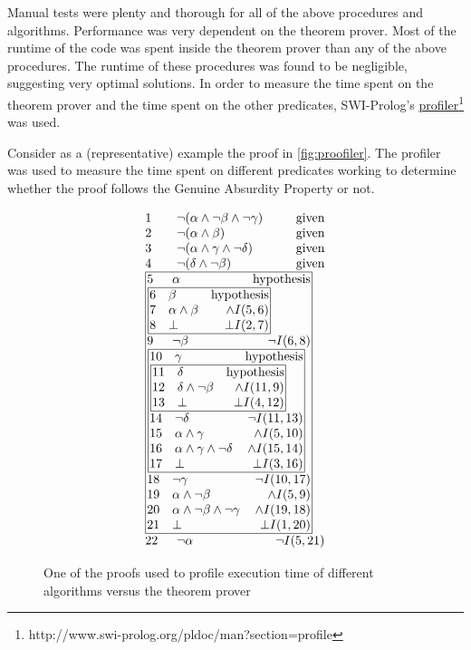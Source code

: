 \documentclass[11pt,twoside,a4paper]{report}
\begin{document}
Manual tests were plenty and thorough for all of the above procedures and algorithms. Performance was very dependent on the theorem prover. Most of the runtime of the code was spent inside the theorem prover than any of the above procedures. The runtime of these procedures was found to be negligible, suggesting very optimal solutions. In order to measure the time spent on the theorem prover and the time spent on the other predicates, SWI-Prolog's \href{http://www.swi-prolog.org/pldoc/man?section=profile}{profiler}\footnote{http://www.swi-prolog.org/pldoc/man?section=profile} was used. 

Consider as a (representative) example the proof in \autoref{fig:proofiler}. The profiler was used to measure the time spent on different predicates working to determine whether the proof follows the Genuine Absurdity Property or not.

\begin{figure}[thp]
\[\vbox{\offinterlineskip\halign{
&\tabskip=1.5em#\strut&$#$\hfil\tabskip=1em&\hfil$#$\tabskip=0em\cr
%
1&\neg(\alpha\wedge\neg\beta\wedge\neg\gamma)&\mbox{given}\cr
2&\neg(\alpha\wedge\beta)&\mbox{given}\cr
3&\neg(\alpha\wedge\gamma\wedge\neg\delta)&\mbox{given}\cr
4&\neg(\delta\wedge\neg\beta)&\mbox{given}\cr
%
\multispan3\vbox{\halign{
\vrule#&&\hskip.1em\tabskip=1em#\strut&$#$\hfil\tabskip=1em&\hfil$#$\hskip0.1em\tabskip=0em&\vrule#\cr
\noalign{\hrule}
%
&5&\alpha&\mbox{hypothesis}&\cr
%
&\multispan3\,\vbox{\halign{
\vrule#&&\hskip.1em\tabskip=1em#\strut&$#$\hfil\tabskip=1em&\hfil$#$\hskip0.1em\tabskip=0em&\vrule#\cr
\noalign{\hrule}
%
&6&\beta&\mbox{hypothesis}&\cr
&7&\alpha\wedge\beta&\wedge I(5,6)&\cr
&8&\bot&\bot I(2,7)&\cr
%
\noalign{\hrule}}}\,&\cr
%
&9&\neg\beta&\neg I(6,8)&\cr
%
&\multispan3\,\vbox{\halign{
\vrule#&&\hskip.1em\tabskip=1em#\strut&$#$\hfil\tabskip=1em&\hfil$#$\hskip0.1em\tabskip=0em&\vrule#\cr
\noalign{\hrule}
%
&10&\gamma&\mbox{hypothesis}&\cr
%
&\multispan3\,\vbox{\halign{
\vrule#&&\hskip.1em\tabskip=1em#\strut&$#$\hfil\tabskip=1em&\hfil$#$\hskip0.1em\tabskip=0em&\vrule#\cr
\noalign{\hrule}
%
&11&\delta&\mbox{hypothesis}&\cr
&12&\delta\wedge\neg\beta&\wedge I(11,9)&\cr
&13&\bot&\bot I(4,12)&\cr
%
\noalign{\hrule}}}\,&\cr
%
&14&\neg\delta&\neg I(11,13)&\cr
&15&\alpha\wedge\gamma&\wedge I(5,10)&\cr
&16&\alpha\wedge\gamma\wedge\neg\delta&\wedge I(15,14)&\cr
&17&\bot&\bot I(3,16)&\cr
%
\noalign{\hrule}}}\,&\cr
%
&18&\neg\gamma&\neg I(10,17)&\cr
&19&\alpha\wedge\neg\beta&\wedge I(5,9)&\cr
&20&\alpha\wedge\neg\beta\wedge\neg\gamma&\wedge I(19,18)&\cr
&21&\bot&\bot I(1,20)&\cr
%
\noalign{\hrule}}}\,\cr
%
22&\neg\alpha&\neg I(5,21)\cr
}}\]
\caption{One of the proofs used to profile execution time of different algorithms versus the theorem prover\label{fig:proofiler}}
\end{figure}
\end{document}
